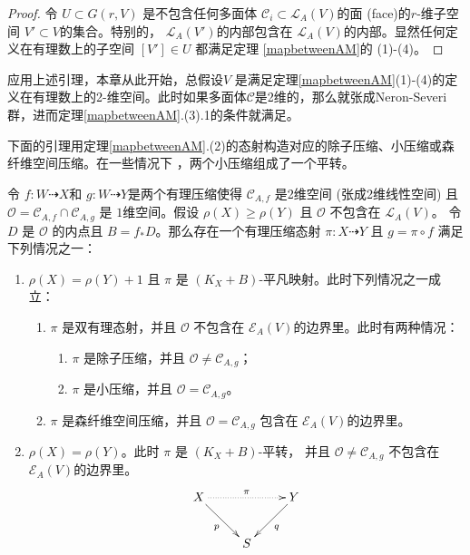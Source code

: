 \begin{proof}
  令 $U \subset G(r, V) $ 是不包含任何多面体 $\mathcal{C}_{i} \subset \mathcal{L}_{A}(V)$的面 (face)的$r$-维子空间  $V' \subset V$的集合。特别的，  $\mathcal{L}_{A}(V')$的内部包含在 $\mathcal{L}_{A}(V)$的内部。显然任何定义在有理数上的子空间 $[V']\in U$ 都满足定理 \ref{mapbetweenAM}的 (1)-(4)。
\end{proof}
\begin{remark}
  应用上述引理，本章从此开始，总假设$V$ 是满足定理\ref{mapbetweenAM}(1)-(4)的定义在有理数上的2-维空间。此时如果多面体$\mathcal{C}$是2维的，那么就张成Neron-Severi群，进而定理\ref{mapbetweenAM}.(3).1的条件就满足。
\end{remark}


下面的引理用定理\ref{mapbetweenAM}.(2)的态射构造对应的除子压缩、小压缩或森纤维空间压缩。在一些情况下 ，两个小压缩组成了一个平转。 
\begin{lemma}\label{mapbetweenAM2}
  \cite[Lemma 3.5]{haconSarkisovProgram2012} 令 $ f:W\dashrightarrow X $和 $ g:W\dashrightarrow  Y $是两个有理压缩使得 $ \mathcal{C}_{A,f} $ 是2维空间 (张成2维线性空间) 且 $ \mathcal{O}=\mathcal{C}_{A,f}\cap \mathcal{C}_{A,g} $ 是 $ 1 $维空间。假设 $ \rho(X)\geqslant \rho(Y) $ 且 $ \mathcal{O} $ 不包含在 $ \mathcal{L}_{A}(V) $。 令 $ D $ 是 $ \mathcal{O} $ 的内点且 $ B=f_*D $。那么存在一个有理压缩态射 $ \pi:X\dashrightarrow Y $ 且 $ g=\pi\circ f $ 满足下列情况之一：
  \begin{enumerate}
    \item $ \rho(X)=\rho(Y)+1 $ 且 $ \pi  $ 是 $ (K_X+B) $-平凡映射。此时下列情况之一成立：
          \begin{enumerate}
            \item $ \pi $ 是双有理态射，并且 $ \mathcal{O} $ 不包含在 $ \mathcal{E}_A(V) $的边界里。此时有两种情况：
                  \begin{enumerate}
                    \item $ \pi $ 是除子压缩，并且 $ \mathcal{O}\neq \mathcal{C}_{A,g} $；
                    \item $ \pi $ 是小压缩，并且 $ \mathcal{O}= \mathcal{C}_{A,g} $。
                  \end{enumerate}
            \item $ \pi $ 是森纤维空间压缩，并且 $ \mathcal{O}=\mathcal{C}_{A,g} $ 包含在 $ \mathcal{E}_{A}(V) $的边界里。
          \end{enumerate}
    \item $ \rho(X)=\rho(Y) $。此时  $ \pi $ 是 $ (K_X+B) $-平转， 并且 $ \mathcal{O}\neq\mathcal{C}_{A,g} $ 不包含在 $ \mathcal{E}_A(V) $的边界里。
      \[ \xymatrix{
          X\ar[rd]_{p} \ar@{.>}[rr]^{\pi} & & Y\ar[ld]^{q} \\
        & S &
        } \]
  \end{enumerate}
\end{lemma}
